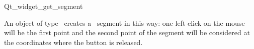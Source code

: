 
\begin{ccRefClass}{Qt_widget_get_segment}

\ccDefinition
An object of type \ccRefName\ creates a \cgal\ segment in this 
way: one left click on the mouse will be the first point and the second point 
of the segment will be considered at the coordinates where the button is 
released.


\ccInheritsFrom
{}

\ccGlue

\ccCreation
{}


\end{ccRefClass}








